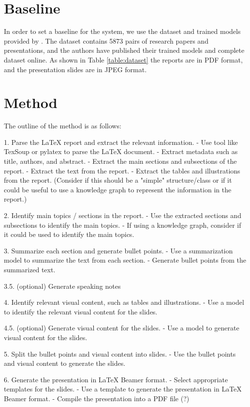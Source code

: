 \section{Baseline}
In order to set a baseline for the system, we use the dataset and trained models provided by \citep{Fu:2022:AAAI}. The dataset contains 5873 pairs of research papers and presentations, and the authors have published their trained models and complete dataset online. As shown in Table \ref{table:dataset} the reports are in PDF format, and the presentation slides are in JPEG format. 

\section{Method}
The outline of the method is as follows:

1. Parse the \LaTeX{} report and extract the relevant information.
    - Use tool like TexSoup or pylatex to parse the \LaTeX{} document.
    - Extract metadata such as title, authors, and abstract.
    - Extract the main sections and subsections of the report.
    - Extract the text from the report.
    - Extract the tables and illustrations from the report.
    (Consider if this should be a "simple" structure/class or if it could be useful to use a knowledge graph to represent the information in the report.)

2. Identify main topics / sections in the report.
    - Use the extracted sections and subsections to identify the main topics.
    - If using a knowledge graph, consider if it could be used to identify the main topics.

3. Summarize each section and generate bullet points.
    - Use a summarization model to summarize the text from each section.
    - Generate bullet points from the summarized text.

3.5. (optional) Generate speaking notes

4. Identify relevant visual content, such as tables and illustrations.
    - Use a model to identify the relevant visual content for the slides.
    
4.5. (optional) Generate visual content for the slides.
    - Use a model to generate visual content for the slides.

5. Split the bullet points and visual content into slides.
    - Use the bullet points and visual content to generate the slides.

6. Generate the presentation in \LaTeX{} Beamer format.
    - Select appropriate templates for the slides.
    - Use a template to generate the presentation in \LaTeX{} Beamer format.
    - Compile the presentation into a PDF file (?)

